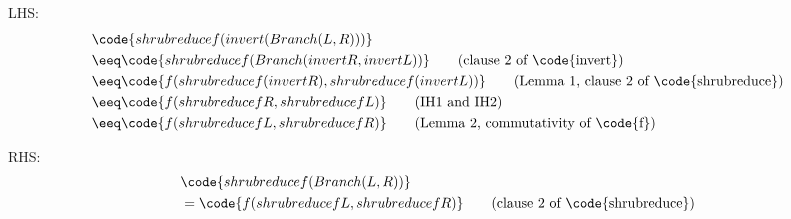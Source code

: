\begin{parts}
\begin{solutionorbox}[13em]
      LHS:
      \begin{align*}
        & \code{shrubreduce f (invert (Branch (L, R)))} \\
        &\eeq \code{shrubreduce f (Branch (invert R, invert L))} \tag{clause 2 of \code{invert}} \\
        &\eeq \code{f (shrubreduce f (invert R), shrubreduce f (invert L))}
          \tag{Lemma 1, clause 2 of \code{shrubreduce}} \\
        &\eeq \code{f (shrubreduce f R, shrubreduce f L)}
          \tag{IH1 and IH2} \\
        &\eeq \code{f (shrubreduce f L, shrubreduce f R)}
          \tag{Lemma 2, commutativity of \code{f}} \\
      \end{align*}

      RHS:
      \begin{align*}
        & \code{shrubreduce f (Branch (L, R))} \\
        &= \code{f (shrubreduce f L, shrubreduce f R)} \tag{clause 2 of \code{shrubreduce}} \\
      \end{align*}
    \end{solutionorbox}

\end{parts}

\newpage
